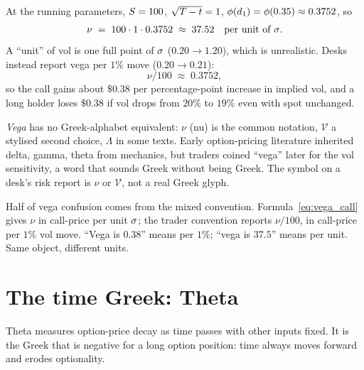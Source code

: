 At the running parameters, $S = 100$, $\sqrt{T - t} = 1$,
$\phi(d_1) = \phi(0.35) \approx 0.3752$, so
\begin{equation}
  \nu \;=\; 100 \cdot 1 \cdot 0.3752 \;\approx\; 37.52
  \quad \text{per unit of $\sigma$}.
  \label{eq:vega_numex}
\end{equation}
A ``unit'' of vol is one full point of $\sigma$ ($0.20 \to 1.20$),
which is unrealistic. Desks instead report vega per $1\%$ move
($0.20 \to 0.21$):
\begin{equation*}
  \nu / 100 \;\approx\; 0.3752,
\end{equation*}
so the call gains about $\$0.38$ per percentage-point increase in
implied vol, and a long holder loses $\$0.38$ if vol drops from
$20\%$ to $19\%$ even with spot unchanged.

\begin{pitfallbox}
\emph{Vega} has no Greek-alphabet equivalent: $\nu$ (nu) is the
common notation, $\mathcal{V}$ a stylised second choice, $\Lambda$
in some texts. Early option-pricing literature inherited delta,
gamma, theta from mechanics, but traders coined ``vega'' later for
the vol sensitivity, a word that sounds Greek without being
Greek. The symbol on a desk's risk report is $\nu$ or
$\mathcal{V}$, not a real Greek glyph.
\end{pitfallbox}

\begin{pitfallbox}
Half of vega confusion comes from the mixed convention.
Formula~\eqref{eq:vega_call} gives $\nu$ in call-price per unit
$\sigma$; the trader convention reports $\nu/100$, in call-price
per $1\%$ vol move. ``Vega is $0.38$'' means per $1\%$; ``vega is
$37.5$'' means per unit. Same object, different units.
\end{pitfallbox}

\section{The time Greek: Theta}
\label{sec:ch16_theta}

Theta measures option-price decay as time passes with other inputs
fixed. It is the Greek that is negative for a long option position:
time always moves forward and erodes optionality.

